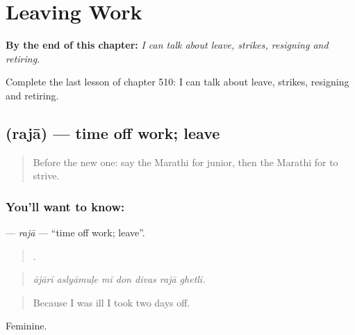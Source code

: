 
\chapter{Leaving Work}
\label{ch:mr-leaving-work}

\begin{chapteropening}
\textbf{By the end of this chapter:} \emph{I can talk about leave, strikes, resigning and retiring.}

Complete the last lesson of chapter 510: I can talk about leave, strikes, resigning and retiring.
\end{chapteropening}

\section[\texorpdfstring{\mr{रजा} (rajā)}{रजा (rajā)}]{ (rajā) — time off work; leave}

\label{lesson:MR-C510-raja-leave}



\begin{quote}
Before the new one: say the Marathi for junior, then the Marathi for to strive.
\end{quote}

\subsection*{You'll want to know: }
\textbf{} — \emph{rajā} — \textquotedblleft{}time off work; leave\textquotedblright{}.

\begin{quote}
      .
\end{quote}

\begin{quote}
\emph{ājārī aslyāmuḷe mī don divas rajā ghetlī.}
\end{quote}

\begin{quote}
Because I was ill I took two days off.
\end{quote}

Feminine.

